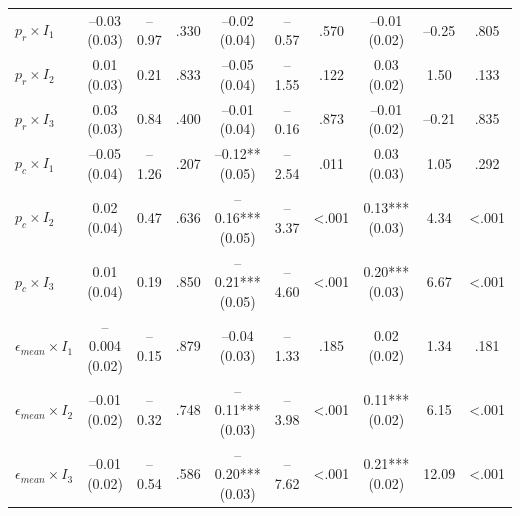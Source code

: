 \documentclass[
  11pt,
]{article}
\begin{document}
\begin{spacing}{1.1}
\begin{ThreePartTable}
\begin{longtable}[t]{>{\raggedright\arraybackslash}p{0.7in}ccccccccc}
\addlinespace
$p_r \times I_1$ & \makecell[c]{–0.03\\(0.03)} & –0.97 & .330 & \makecell[c]{–0.02\\(0.04)} & –0.57 & .570 & \makecell[c]{–0.01\\(0.02)} & –0.25 & .805 \\
$p_r \times I_2$ & \makecell[c]{0.01\\(0.03)} & 0.21 & .833 & \makecell[c]{–0.05\\(0.04)} & –1.55 & .122 & \makecell[c]{0.03\\(0.02)} & 1.50 & .133 \\
$p_r \times I_3$ & \makecell[c]{0.03\\(0.03)} & 0.84 & .400 & \makecell[c]{–0.01\\(0.04)} & –0.16 & .873 & \makecell[c]{–0.01\\(0.02)} & –0.21 & .835 \\
$p_c \times I_1$ & \makecell[c]{–0.05\\(0.04)} & –1.26 & .207 & \makecell[c]{–0.12**\\(0.05)} & –2.54 & .011 & \makecell[c]{0.03\\(0.03)} & 1.05 & .292 \\
$p_c \times I_2$ & \makecell[c]{0.02\\(0.04)} & 0.47 & .636 & \makecell[c]{–0.16***\\(0.05)} & –3.37 & <.001 & \makecell[c]{0.13***\\(0.03)} & 4.34 & <.001\\
$p_c \times I_3$ & \makecell[c]{0.01\\(0.04)} & 0.19 & .850 & \makecell[c]{–0.21***\\(0.05)} & –4.60 & <.001 & \makecell[c]{0.20***\\(0.03)} & 6.67 & <.001\\
$\epsilon_{mean} \times I_1$ & \makecell[c]{–0.004\\(0.02)} & –0.15 & .879 & \makecell[c]{–0.04\\(0.03)} & –1.33 & .185 & \makecell[c]{0.02\\(0.02)} & 1.34 & .181 \\
$\epsilon_{mean} \times I_2$ & \makecell[c]{–0.01\\(0.02)} & –0.32 & .748 & \makecell[c]{–0.11***\\(0.03)} & –3.98 & <.001 & \makecell[c]{0.11***\\(0.02)} & 6.15 & <.001\\
$\epsilon_{mean} \times I_3$ & \makecell[c]{–0.01\\(0.02)} & –0.54 & .586 & \makecell[c]{–0.20***\\(0.03)} & –7.62 & <.001 & \makecell[c]{0.21***\\(0.02)} & 12.09 & <.001 \\

\end{longtable}
\end{ThreePartTable}
\end{spacing}
\end{document}
